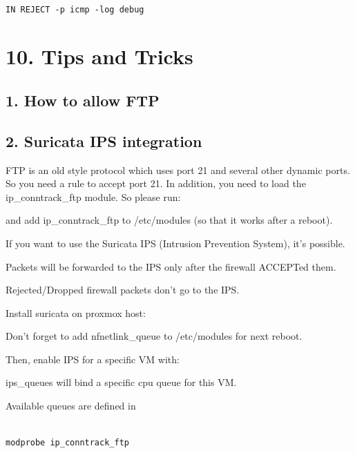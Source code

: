 \begin{lstlisting}

IN REJECT -p icmp -log debug

\end{lstlisting}

\begin{table}[htbp]

\centering

\begin{tabular}

\end{tabular}

\end{table}


\section{10. Tips and Tricks}

\subsection{1. How to allow FTP}

\subsection{2. Suricata IPS integration}

FTP is an old style protocol which uses port 21 and several other dynamic ports. So you need a rule to accept port 21. In addition, you need to load the ip_conntrack_ftp module. So please run:

and add ip_conntrack_ftp to /etc/modules (so that it works after a reboot).

If you want to use the Suricata IPS (Intrusion Prevention System), it’s possible.

Packets will be forwarded to the IPS only after the firewall ACCEPTed them.

Rejected/Dropped firewall packets don’t go to the IPS.

Install suricata on proxmox host:

Don’t forget to add nfnetlink_queue to /etc/modules for next reboot.

Then, enable IPS for a specific VM with:

ips_queues will bind a specific cpu queue for this VM.

Available queues are defined in

\begin{lstlisting}

modprobe ip_conntrack_ftp

\end{lstlisting}

